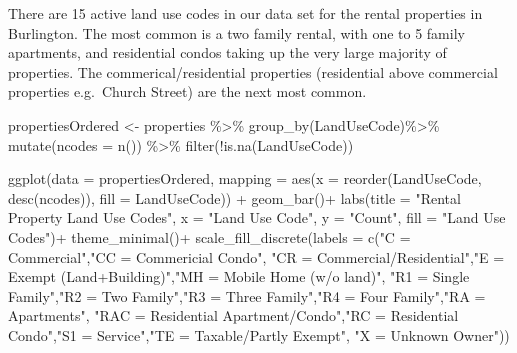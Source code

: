 \documentclass[
]{article}
\newenvironment{Shaded}{\begin{snugshade}}{\end{snugshade}}
\newcommand{\AttributeTok}[1]{\textcolor[rgb]{0.77,0.63,0.00}{#1}}
\newcommand{\FunctionTok}[1]{\textcolor[rgb]{0.00,0.00,0.00}{#1}}
\newcommand{\NormalTok}[1]{#1}
\newcommand{\OtherTok}[1]{\textcolor[rgb]{0.56,0.35,0.01}{#1}}
\newcommand{\SpecialCharTok}[1]{\textcolor[rgb]{0.00,0.00,0.00}{#1}}
\newcommand{\StringTok}[1]{\textcolor[rgb]{0.31,0.60,0.02}{#1}}
\begin{document}
There are 15 active land use codes in our data set for the rental
properties in Burlington. The most common is a two family rental, with
one to 5 family apartments, and residential condos taking up the very
large majority of properties. The commerical/residential properties
(residential above commercial properties e.g.~Church Street) are the
next most common.

\begin{Shaded}
\begin{Highlighting}[]
\NormalTok{propertiesOrdered }\OtherTok{\textless{}{-}}\NormalTok{ properties }\SpecialCharTok{\%\textgreater{}\%} \FunctionTok{group\_by}\NormalTok{(LandUseCode)}\SpecialCharTok{\%\textgreater{}\%}
  \FunctionTok{mutate}\NormalTok{(}\AttributeTok{ncodes =} \FunctionTok{n}\NormalTok{()) }\SpecialCharTok{\%\textgreater{}\%} \FunctionTok{filter}\NormalTok{(}\SpecialCharTok{!}\FunctionTok{is.na}\NormalTok{(LandUseCode))}

\FunctionTok{ggplot}\NormalTok{(}\AttributeTok{data =}\NormalTok{ propertiesOrdered,}
       \AttributeTok{mapping =} \FunctionTok{aes}\NormalTok{(}\AttributeTok{x =} \FunctionTok{reorder}\NormalTok{(LandUseCode, }\FunctionTok{desc}\NormalTok{(ncodes)), }\AttributeTok{fill =}\NormalTok{ LandUseCode)) }\SpecialCharTok{+} 
        \FunctionTok{geom\_bar}\NormalTok{()}\SpecialCharTok{+}
        \FunctionTok{labs}\NormalTok{(}\AttributeTok{title =} \StringTok{"Rental Property Land Use Codes"}\NormalTok{, }
             \AttributeTok{x =} \StringTok{"Land Use Code"}\NormalTok{, }
             \AttributeTok{y =} \StringTok{"Count"}\NormalTok{,}
             \AttributeTok{fill =} \StringTok{"Land Use Codes"}\NormalTok{)}\SpecialCharTok{+}
        \FunctionTok{theme\_minimal}\NormalTok{()}\SpecialCharTok{+}
        \FunctionTok{scale\_fill\_discrete}\NormalTok{(}\AttributeTok{labels =} \FunctionTok{c}\NormalTok{(}\StringTok{"C = Commercial"}\NormalTok{,}\StringTok{"CC = Commericial Condo"}\NormalTok{,}
                                       \StringTok{"CR = Commercial/Residential"}\NormalTok{,}\StringTok{"E = Exempt (Land+Building)"}\NormalTok{,}\StringTok{"MH = Mobile Home (w/o land)"}\NormalTok{,}
                                       \StringTok{"R1 = Single Family"}\NormalTok{,}\StringTok{"R2 = Two Family"}\NormalTok{,}\StringTok{"R3 = Three Family"}\NormalTok{,}\StringTok{"R4 = Four Family"}\NormalTok{,}\StringTok{"RA = Apartments"}\NormalTok{,}
                                       \StringTok{"RAC = Residential Apartment/Condo"}\NormalTok{,}\StringTok{"RC = Residential Condo"}\NormalTok{,}\StringTok{"S1 = Service"}\NormalTok{,}\StringTok{"TE = Taxable/Partly Exempt"}\NormalTok{,}
                                       \StringTok{"X = Unknown Owner"}\NormalTok{))}
\end{Highlighting}
\end{Shaded}
\end{document}
